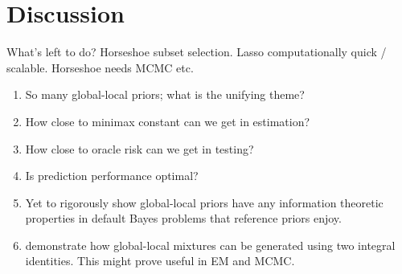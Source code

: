 \documentclass[11pt]{article}
\numberwithin{equation}{section}
\begin{document}


\section{Discussion}

What's left to do? Horseshoe subset selection. Lasso computationally quick / scalable. Horseshoe needs MCMC etc. 


\begin{enumerate}
\item So many global-local priors; what is the unifying theme?

\item How close to minimax constant can we get in estimation?

\item How close to oracle risk can we get in testing?

\item Is prediction performance optimal?

\item Yet to rigorously show global-local priors have any information theoretic properties in default Bayes problems that reference priors \citep{bernardo1979reference} enjoy.

\item \citet{bhadra2016global} demonstrate how global-local mixtures can be generated using two integral identities. This might prove useful in EM and MCMC.
\end{enumerate}
\end{document}
